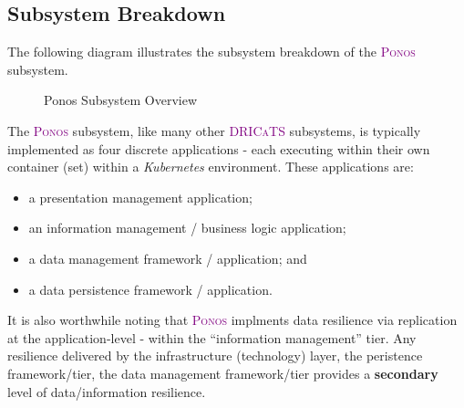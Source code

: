 \documentclass[a4paper]{book}
\newcommand{\dricats}{\textsc{\textcolor{Purple}{\small{DRICaTS }}}}
\newcommand{\ponos}{\textsc{\textcolor{Purple}{\small{Ponos }}}}
\begin{document}
\subsection{Subsystem Breakdown}

The following diagram illustrates the subsystem breakdown of the \ponos subsystem.

\begin{figure}[h!]
    \begin{adjustbox}{max size={0.95\textwidth}{0.9\textheight}, center}
    \end{adjustbox}
    \caption{Ponos Subsystem Overview}
    \label{fig:conceptual-overview-ponos}
\end{figure}

The \ponos subsystem, like many other \dricats subsystems, is typically implemented as four discrete applications - each executing within their own container (set) within a \textit{Kubernetes} environment. These applications are:
\begin{itemize}[noitemsep]
 \item a presentation management application;
 \item an information management / business logic application;
 \item a data management framework / application; and
 \item a data persistence framework / application.
\end{itemize}

It is also worthwhile noting that \ponos implments data resilience via replication at the application-level - within the ``information management'' tier. Any resilience delivered by the infrastructure (technology) layer, the peristence framework/tier, the data management framework/tier provides a \textbf{secondary} level of data/information resilience.
\end{document}
